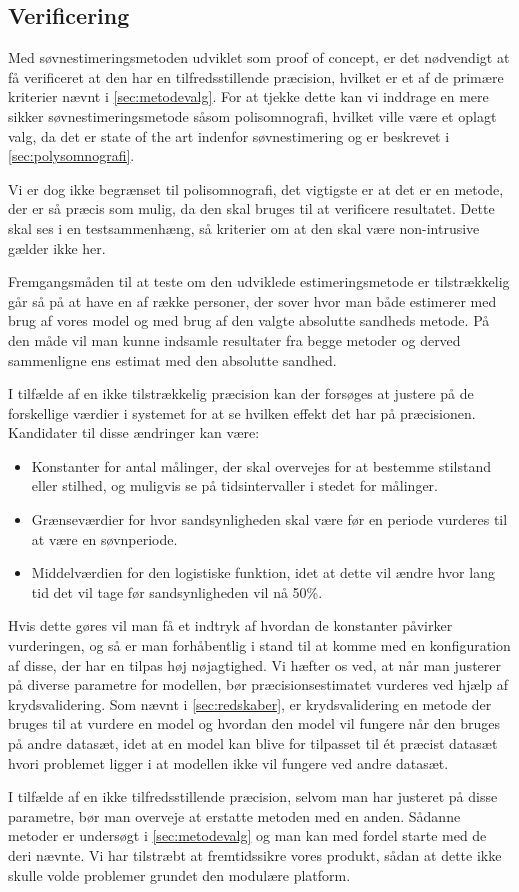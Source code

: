 \subsection{Verificering}
Med søvnestimeringsmetoden udviklet som proof of concept, er det nødvendigt at få verificeret at den har en tilfredsstillende præcision, hvilket er et af de primære kriterier nævnt i \cref{sec:metodevalg}.
For at tjekke dette kan vi inddrage en mere sikker søvnestimeringsmetode såsom polisomnografi, hvilket ville være et oplagt valg, da det er state of the art indenfor søvnestimering og er beskrevet i \cref{sec:polysomnografi}.

Vi er dog ikke begrænset til polisomnografi, det vigtigste er at det er en metode, der er så præcis som mulig, da den skal bruges til at verificere resultatet.
Dette skal ses i en testsammenhæng, så kriterier om at den skal være non-intrusive gælder ikke her.

Fremgangsmåden til at teste om den udviklede estimeringsmetode er tilstrækkelig går så på at have en af række personer, der sover hvor man både estimerer med brug af vores model og med brug af den valgte absolutte sandheds metode.
På den måde vil man kunne indsamle resultater fra begge metoder og derved sammenligne ens estimat med den absolutte sandhed.

I tilfælde af en ikke tilstrækkelig præcision kan der forsøges at justere på de forskellige værdier i systemet for at se hvilken effekt det har på præcisionen.
Kandidater til disse ændringer kan være:
\begin{itemize}
	\item Konstanter for antal målinger, der skal overvejes for at bestemme stilstand eller stilhed, og muligvis se på tidsintervaller i stedet for målinger.
	\item Grænseværdier for hvor sandsynligheden skal være før en periode vurderes til at være en søvnperiode.
	\item Middelværdien for den logistiske funktion, idet at dette vil ændre hvor lang tid det vil tage før sandsynligheden vil nå 50\%.
\end{itemize} 

Hvis dette gøres vil man få et indtryk af hvordan de konstanter påvirker vurderingen, og så er man forhåbentlig i stand til at komme med en konfiguration af disse, der har en tilpas høj nøjagtighed.
Vi hæfter os ved, at når man justerer på diverse parametre for modellen, bør præcisionsestimatet vurderes ved hjælp af krydsvalidering.
Som nævnt i \cref{sec:redskaber}, er krydsvalidering en metode der bruges til at vurdere en model og hvordan den model vil fungere når den bruges på andre datasæt, idet at en model kan blive for tilpasset til ét præcist datasæt hvori problemet ligger i at modellen ikke vil fungere ved andre datasæt.

I tilfælde af en ikke tilfredsstillende præcision, selvom man har justeret på disse parametre, bør man overveje at erstatte metoden med en anden.
Sådanne metoder er undersøgt i \cref{sec:metodevalg} og man kan med fordel starte med de deri nævnte.
Vi har tilstræbt at fremtidssikre vores produkt, sådan at dette ikke skulle volde problemer grundet den modulære platform.
